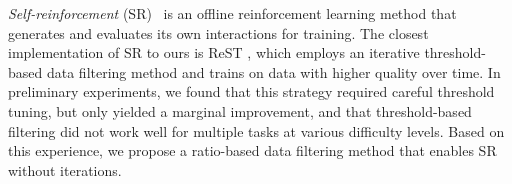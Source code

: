 \textit{Self-reinforcement} (SR)~\citep{bandura1976self} is an offline reinforcement learning method that generates and evaluates its own interactions for training. The closest implementation of SR to ours is ReST \citep{ReST}, which employs an iterative threshold-based data filtering method and trains on data with higher quality over time. In preliminary experiments, we found that this strategy required careful threshold tuning, but only yielded a marginal improvement, and that threshold-based filtering did not work well for multiple tasks at various difficulty levels. Based on this experience, we propose a ratio-based data filtering method that enables SR without iterations. 

